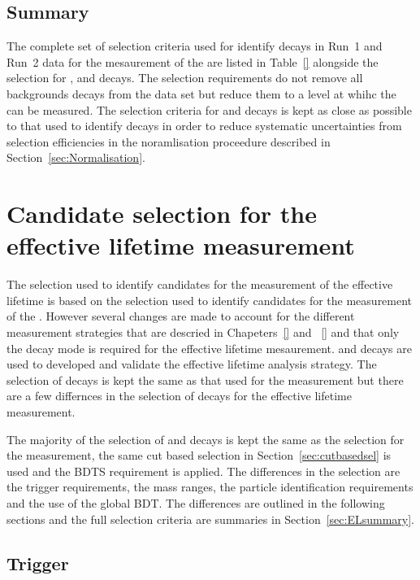 \subsection{Summary}
\label{sec:BFsummary}
The complete set of selection criteria used for identify \bmumu decays in Run~1 and Run~2 data for the mesaurement of the \bmumu \BFs are listed in Table~\ref{} alongside the selection for \bhh, \bujpsik and \bsjpsiphi decays.
The selection requirements do not remove all backgrounds decays from the data set but reduce them to a level at whihc the \BFs can be measured. The selection criteria for \bhh and \bujpsik decays is kept as close as possible to that used to identify \bmumu decays in order to reduce systematic uncertainties from selection efficiencies in the noramlisation proceedure described in Section~\ref{sec:Normalisation}. 
\section{Candidate selection for the effective lifetime measurement}
\label{sec:ELsel}
The selection used to identify candidates for the measurement of the \bsmumu effective lifetime is based on the selection used to identify candidates for the measurement of the \bmumu \BFs. However several changes are made to account for the different measurement strategies that are descried in Chapeters~\ref{} and ~\ref{} and that only the \bs decay mode is required for the effective lifetime mesaurement. 
\bhh and \bsjpisphi decays are used to developed and validate the effective lifetime analysis strategy. The selection of \bsjpsiphi decays is kept the same as that used for the \BF measurement but there are a few differnces in the selection of \bhh decays for the effective lifetime measurement.

The majority of the selection of \bsmumu and \bhh decays is kept the same as the selection for the \BF measurement, the same cut based selection in Section~\ref{sec:cutbasedsel} is used and the BDTS requirement is applied.   
The differences in the selection are the trigger requirements, the mass ranges, the particle identification requirements and the use of the global BDT. The differences are outlined in the following sections and the full selection criteria are summaries in Section~\ref{sec:ELsummary}.


\subsection{Trigger}
\label{sec:ELtrigger}

